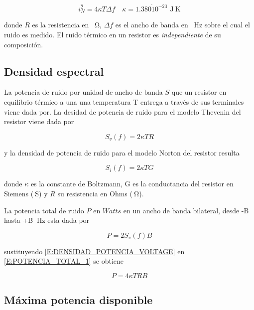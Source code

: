 \documentclass[10pt, letter]{article}
\begin{document}
	\begin{equation}
		\label{E:CORRIENTE_RUIDO}
		\bar{i^2_{N}} = 4{\kappa}T{\Delta}f
		\text{$\quad{\kappa}=1.380\dot10^{-23} \, {\SI{}\joule}{\SI{}\kelvin}$} 	
	\end{equation}
	
	\noindent donde $R$ es la resistencia en \SI{}{\ohm}, ${\Delta}f$ es el ancho de banda en \SI{}{\hertz} sobre el cual el ruido es medido. El ruido térmico en un resistor es \emph{independiente} de su composición.
	
	\subsection{Densidad espectral}
	
	La potencia de ruido por unidad de ancho de banda $S$ que un resistor en equilibrio térmico a una una temperatura T entrega a través de sus terminales viene dada por. La desidad de potencia de ruido para el modelo Thevenin del resistor viene dada por
	
	\begin{equation}
		\label{E:DENSIDAD_POTENCIA_VOLTAGE}
		S_{v}(f) = 2{\kappa}TR
	\end{equation}

\noindent y la densidad de potencia de ruido para el modelo Norton del resistor resulta	
	
	\begin{equation}
		\label{E:DENSIDAD_POTENCIA_CORRIENTE}
		S_{i}(f) = 2{\kappa}TG
	\end{equation}	

\noindent donde $\kappa$ es la constante de Boltzmann, G es la conductancia del resistor en Siemens ($\SI{}\siemens$) y $R$ su resistencia en Ohms ($\SI{}\ohm$).	

	La potencia total de ruido $P$ en $Watts$ en un ancho de banda bilateral, desde -B hasta +B $\SI{}\hertz$ esta dada por
	
	\begin{equation}
		\label{E:POTENCIA_TOTAL_1}
		P = 2S_{v}(f)B
	\end{equation}
	
	\noindent sustituyendo \eqref{E:DENSIDAD_POTENCIA_VOLTAGE} en \eqref{E:POTENCIA_TOTAL_1} se obtiene
	
	\begin{equation}
		\label{E:POTENCIA_TOTAL_2}
		P = 4{\kappa}TRB
	\end{equation}	

	\subsection{Máxima potencia disponible}
	
\end{document}
